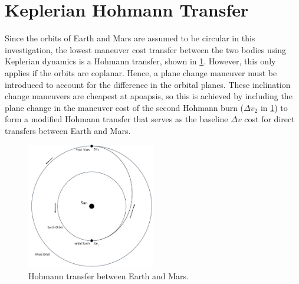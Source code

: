 \section{Keplerian Hohmann Transfer}
Since the orbits of Earth and Mars are assumed to be circular in this investigation, the lowest
maneuver cost transfer between the two bodies using Keplerian dynamics is a Hohmann transfer, shown
in \cref{fig:Hohmann}. However, this only applies if the orbits are coplanar. Hence, a plane change
maneuver must be introduced to account for the difference in the orbital planes. These inclination
change maneuvers are cheapest at apoapsis, so this is achieved by including the plane change in the
maneuver cost of the second Hohmann burn ($\Delta v_{2}$ in \cref{fig:Hohmann}) to form a modified
Hohmann transfer that serves as the baseline $\Delta v$ cost for direct transfers between Earth and
Mars.

\begin{figure}[ht]
    \centering
    \includegraphics[width=0.5\textwidth]{figures/Hohmann.jpg}
    \caption{Hohmann transfer between Earth and Mars.}
    \label{fig:Hohmann}
\end{figure}

